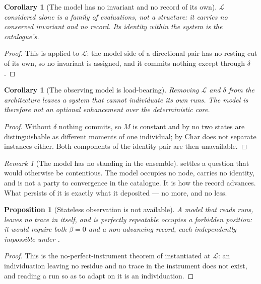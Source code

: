\documentclass[twocolumn,11pt,a4paper]{article}
\theoremstyle{sup}
\newtheorem{proposition}[theorem]{Proposition}
\newtheorem{corollary}[theorem]{Corollary}
\theoremstyle{definition}
\theoremstyle{remark}
\newtheorem{remark}[theorem]{Remark}
\newcommand{\flo}{\beta}
\newcommand{\rec}{M}
\newcommand{\Char}{\mathrm{Char}}
\newcommand{\Mod}{\mathcal{L}}
\newcommand{\dep}{\delta}
\begin{document}
\begin{corollary}[The model has no invariant and no record of its own]
\label{cor:model-no-invariant}
$\Mod$ considered alone is a family of evaluations, not a structure: it carries
no conserved invariant and no record. Its identity within the system is the
catalogue's.
\end{corollary}

\begin{proof}
This is \citet[Cor.~11.7]{sachikonye2025directional} applied to $\Mod$: the
model side of a directional pair has no resting cut of its own, so no invariant
is assigned, and it commits nothing except through $\dep$.
\end{proof}

\begin{corollary}[The observing model is load-bearing]
\label{cor:model-necessary}
Removing $\Mod$ and $\dep$ from the architecture leaves a system that cannot
individuate its own runs. The model is therefore not an optional enhancement
over the deterministic core.
\end{corollary}

\begin{proof}
Without $\dep$ nothing commits, so $\rec$ is constant and by
 no two states are distinguishable as different
moments of one individual; by  $\Char$ does not
separate instances either. Both components of the identity pair are then
unavailable.
\end{proof}

\begin{remark}[The model has no standing in the ensemble]
\label{rem:no-standing}
 settles a question that would otherwise be
contentious. The model occupies no node, carries no identity, and is not a
party to convergence in the catalogue. It is how the record advances. What
persists of it is exactly what it deposited --- no more, and no less.
\end{remark}

\begin{proposition}[Stateless observation is not available]
\label{prop:no-stateless}
A model that reads runs, leaves no trace in itself, and is perfectly repeatable
occupies a forbidden position: it would require both $\flo=0$ and a
non-advancing record, each independently impossible under .
\end{proposition}

\begin{proof}
This is the no-perfect-instrument theorem of
\citet[\S6.1]{sachikonye2025directional} instantiated at $\Mod$: an
individuation leaving no residue and no trace in the instrument does not exist,
and reading a run so as to adapt on it is an individuation.
\end{proof}
\end{document}
